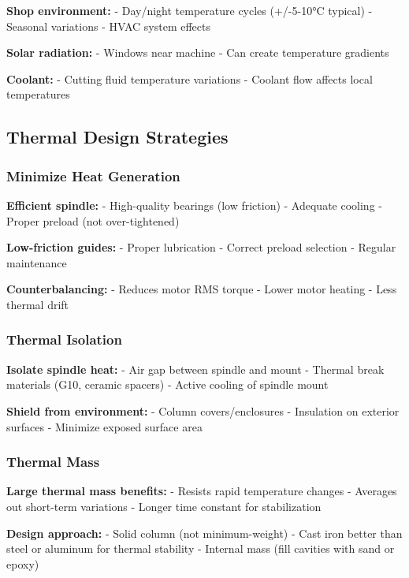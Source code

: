 \documentclass[
]{article}
\begin{document}
\textbf{Shop environment:} - Day/night temperature cycles (+/-5-10°C
typical) - Seasonal variations - HVAC system effects

\textbf{Solar radiation:} - Windows near machine - Can create
temperature gradients

\textbf{Coolant:} - Cutting fluid temperature variations - Coolant flow
affects local temperatures

\subsection{Thermal Design Strategies}\label{thermal-design-strategies}

\subsubsection{Minimize Heat Generation}\label{minimize-heat-generation}

\textbf{Efficient spindle:} - High-quality bearings (low friction) -
Adequate cooling - Proper preload (not over-tightened)

\textbf{Low-friction guides:} - Proper lubrication - Correct preload
selection - Regular maintenance

\textbf{Counterbalancing:} - Reduces motor RMS torque - Lower motor
heating - Less thermal drift

\subsubsection{Thermal Isolation}\label{thermal-isolation}

\textbf{Isolate spindle heat:} - Air gap between spindle and mount -
Thermal break materials (G10, ceramic spacers) - Active cooling of
spindle mount

\textbf{Shield from environment:} - Column covers/enclosures -
Insulation on exterior surfaces - Minimize exposed surface area

\subsubsection{Thermal Mass}\label{thermal-mass}

\textbf{Large thermal mass benefits:} - Resists rapid temperature
changes - Averages out short-term variations - Longer time constant for
stabilization

\textbf{Design approach:} - Solid column (not minimum-weight) - Cast
iron better than steel or aluminum for thermal stability - Internal mass
(fill cavities with sand or epoxy)
\end{document}
